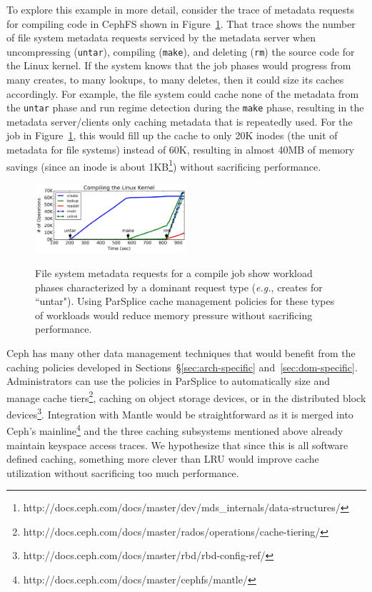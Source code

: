 To explore this example in more detail, consider the trace of metadata requests
for compiling code in CephFS shown in Figure~\ref{fig:compile-ops}.  That trace
shows the number of file system metadata requests serviced by the metadata
server when uncompressing (\texttt{untar}), compiling (\texttt{make}), and
deleting (\texttt{rm}) the source code for the Linux kernel. If the system
knows that the job phases would progress from many creates, to many lookups, to
many deletes, then it could size its caches accordingly. For example, the file
system could cache none of the metadata from the \texttt{untar} phase and run
regime detection during the \texttt{make} phase, resulting in the metadata
server/clients only caching metadata that is repeatedly used. For the job in
Figure~\ref{fig:compile-ops}, this would fill up the cache to only 20K inodes
(the unit of metadata for file systems) instead of 60K, resulting in almost
40MB of memory savings (since an inode is about
1KB\footnote{http://docs.ceph.com/docs/master/dev/mds\_internals/data-structures/})
without sacrificing performance.

\begin{figure}[t]
\noindent\includegraphics[width=0.5\textwidth]{figures/compile-ops.png}\\
\caption{File system metadata requests for a compile job show workload phases
characterized by a dominant request type ({\it e.g.}, creates for ``untar").
Using ParSplice cache management policies for these types of workloads would
reduce memory pressure without sacrificing performance.
\label{fig:compile-ops}}
\end{figure}

Ceph has many other data management techniques that would benefit from the
caching policies developed in Sections~\S\ref{sec:arch-specific}
and~\ref{sec:dom-specific}. Administrators can use the policies in ParSplice to
automatically size and manage cache
tiers\footnote{http://docs.ceph.com/docs/master/rados/operations/cache-tiering/},
caching on object storage devices, or in the distributed block
devices\footnote{http://docs.ceph.com/docs/master/rbd/rbd-config-ref/}.
Integration with Mantle would be straightforward as it is merged into Ceph's
mainline\footnote{http://docs.ceph.com/docs/master/cephfs/mantle/} and the
three caching subsystems mentioned above already maintain keyspace access
traces. We hypothesize that since this is all software defined caching,
something more clever than LRU would improve cache utilization without
sacrificing too much performance.

